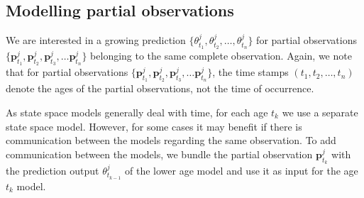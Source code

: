 \documentclass[a4paper,11pt]{article}
\begin{document}
\subsection{Modelling partial observations}

We are interested in a growing prediction $\{\theta^j_{t_1}, \theta^j_{t_2}, \dots, \theta^j_{t_n} \}$ for partial observations $\{\bm{p}^j_{t_1},\bm{p}^j_{t_2}, \bm{p}^j_{t_3}, \ldots \bm{p}^j_{t_n}\}$ belonging to the same complete observation. Again, we note that for partial observations $\{\bm{p}^j_{t_1},\bm{p}^j_{t_2}, \bm{p}^j_{t_3}, \ldots \bm{p}^j_{t_n}\}$, the time stamps $(t_1, t_2, \ldots, t_n)$ denote the ages of the partial observations, not the time of occurrence. %

As state space models generally deal with time, for each age $t_k$ we use a separate state space model. However, for some cases it may benefit if there is communication between the models regarding the same observation. To add communication between the models, we bundle the partial observation $\bm{p}^j_{t_k}$ with the prediction output $\theta^j_{t_{k-1}}$ of the lower age model and use it as input for the age $t_k$ model. %
\end{document}
